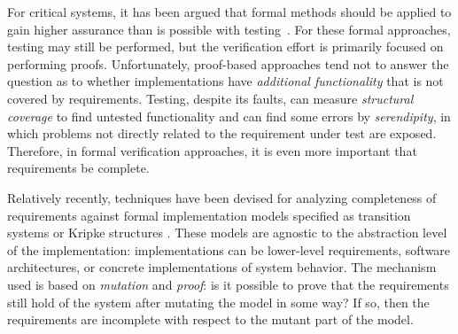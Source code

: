 

For critical systems, it has been argued that formal methods
should be applied to gain higher assurance than is possible with testing~\cite{Miller10:CACM,Rushby09:SEFM,Hardin09:Security}.  For these formal approaches, testing may still be performed, but the verification effort is primarily focused on performing proofs.  Unfortunately, proof-based approaches tend not to answer the question as to whether implementations have {\em additional functionality} that is not covered by requirements.  Testing, despite its faults, can measure {\em structural coverage} to find untested functionality and can find some errors by {\em serendipity}, in which problems not directly related to the requirement under test are exposed.  Therefore, in formal verification approaches, it is even more important that requirements be complete.

Relatively recently, techniques have been devised for analyzing completeness of requirements against formal implementation models specified as transition systems or Kripke structures \cite{chockler2001practical,das2005formal, claessen2007coverage, grosse2007estimating}.  These models are agnostic to the abstraction level of the implementation: implementations can be lower-level requirements, software architectures, or concrete implementations of system behavior.  The mechanism used is based on {\em mutation} and {\em proof}: is it possible to prove that the requirements still hold of the system after mutating the model in some way?  If so, then the requirements are incomplete with respect to the mutant part of the model.

